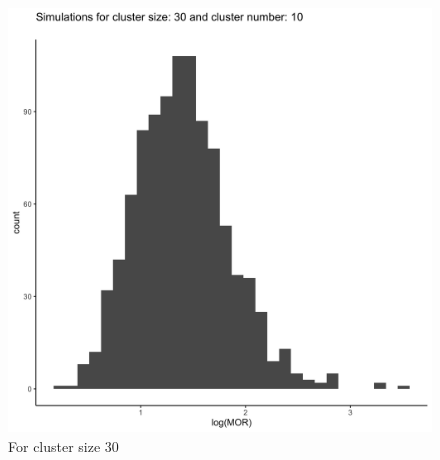 \documentclass[
  letterpaper,
  DIV=11,
  numbers=noendperiod,
  titlepage]{scrartcl}
\begin{document}
\begin{figure}
\begin{minipage}[t]{0.50\linewidth}
{{\includegraphics{../plots/ran-int/hist_10_30.png}

}

\caption{For cluster size 30}

}

\end{minipage}%
%
\begin{minipage}[t]{0.50\linewidth}

{\centering 

}
\end{minipage}
\end{figure}
\end{document}
